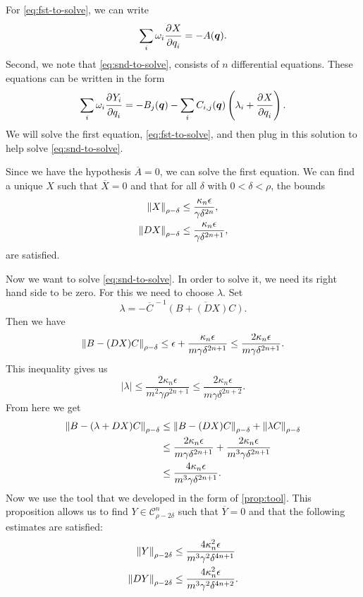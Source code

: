 \documentclass[twoside,letterpaper,11pt]{article}
\numberwithin{equation}{section}
\begin{document}
For \cref{eq:fst-to-solve}, we can write
\begin{equation*}
  \sum_i \omega_i \frac{\strut\partial^{}X}{\strut\partial q_i^{}} = -A(\bm{q}).
\end{equation*}
Second, we note that \cref{eq:snd-to-solve}, consists of $n$ differential
equations.
These equations can be written in the form
\begin{equation*}  
  \sum_i \omega_i \frac{\strut\partial^{}Y_i}{\strut\partial q_i^{}} = -B_j(\bm{q}) - \sum_i C_{i,j}(\bm{q}) \left(
  \lambda_i + \frac{\strut\partial^{}X}{\strut\partial q_i^{}} \right).
\end{equation*}
We will solve the first equation, \cref{eq:fst-to-solve}, and then plug in this
solution to help solve \cref{eq:snd-to-solve}.

Since we have the hypothesis $\overline{A} = 0$, we can solve the first
equation.
We can find a unique $X$ such that $\overline{X} = 0$ and that for all $\delta$
with $0 < \delta < \rho$, the bounds
\begin{align*}
  \norm{X}_{\rho - \delta} &\leq \frac{\kappa_n \epsilon}{\gamma \delta^{2n}},\\
  \norm{\Dif X}_{\rho - \delta} &\leq \frac{\kappa_n \epsilon}{\gamma
                   \delta^{2n+1}},
\end{align*}
are satisfied.

Now we want to solve \cref{eq:snd-to-solve}.
In order to solve it, we need its right hand side to be zero.
For this we need to choose $\lambda$.
Set
\begin{equation*}
  \lambda = - \overline{C}^{\,-1} \overline{(B + (DX)C)}.
\end{equation*}
Then we have
\begin{equation*}
  \norm{B - (DX)C}_{\rho - \delta} \leq \epsilon + \frac{\kappa_n \epsilon}{m
    \gamma \delta^{2n+1}} \leq \frac{2 \kappa_n \epsilon}{m \gamma \delta^{2n +
  1}}.
\end{equation*}
This inequality gives us
\begin{equation*}
  |\lambda| \leq \frac{2\kappa_n \epsilon}{m^2 \gamma \rho^{2n+1}} \leq \frac{2
    \kappa_n \epsilon}{m \gamma \delta^{2n + 2}}.
\end{equation*}
From here we get
\begin{align*}
  \norm{B - (\lambda + DX)C}_{\rho - \delta}
  &\leq \norm{B - (DX)C}_{\rho - \delta} + \norm{\lambda C}_{\rho - \delta}\\
  &\leq \frac{2 \kappa_n \epsilon}{m \gamma \delta^{2n + 1}} + \frac{2\kappa_n
    \epsilon}{m^3 \gamma \delta^{2n+1}}\\
  &\leq \frac{4 \kappa_n \epsilon}{m^3 \gamma \delta^{2n+1}}.
\end{align*}
Now we use the tool that we developed in the form of \cref{prop:tool}.
This proposition allows us to find $Y \in \mathcal{C}_{\rho - 2\delta}^n$ such
that $\overline{Y} = 0$ and that the following estimates are satisfied:
\begin{align*}
  \norm{Y}_{\rho - 2\delta} &\leq \frac{4\kappa_n^2 \epsilon}{m^3 \gamma^2
                              \delta^{4n+1}}\\
  \norm{\Dif Y}_{\rho - 2\delta} &\leq \frac{4\kappa_n^2 \epsilon}{m^3 \gamma^2
                    \delta^{4n+2}}.
\end{align*}
\end{document}
